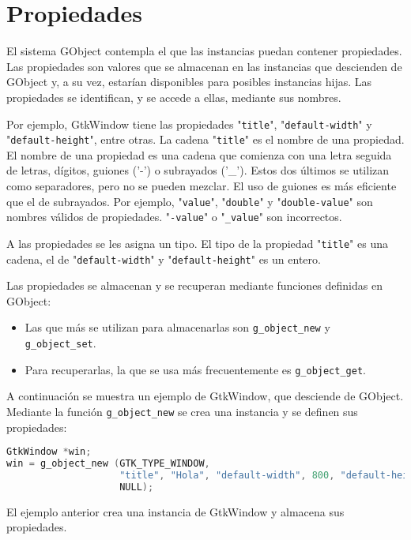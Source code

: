 %

\section{Propiedades}
El sistema \textsf{GObject} contempla el que las instancias puedan contener propiedades. Las propiedades son valores que se almacenan en las instancias que descienden de \textsf{GObject} y, a su vez, estarían disponibles para posibles instancias hijas.
Las propiedades se identifican, y se accede a ellas, mediante sus nombres.

Por ejemplo, \textsf{GtkWindow} tiene las propiedades "\texttt{title}",
"\texttt{default-width}" y "\texttt{default-height}", entre otras. La cadena
"\texttt{title}" es el nombre de una propiedad. El nombre de una propiedad es una cadena
que comienza con una letra seguida de letras, dígitos, guiones ('-') o subrayados
('\_'). Estos dos últimos se utilizan como separadores, pero no se pueden mezclar. El
uso de guiones es más eficiente que el de subrayados. Por ejemplo, "\texttt{value}",
"\texttt{double}" y "\texttt{double-value}" son nombres válidos de propiedades.
"\texttt{-value}" o "\texttt{\_value}" son incorrectos.

A las propiedades se les asigna un tipo. El tipo de la propiedad "\texttt{title}" es una cadena, el de "\texttt{default-width}" y "\texttt{default-height}" es un entero.

Las propiedades se almacenan y se recuperan mediante funciones definidas en
\textsf{GObject}:
\vspace{-\topsep}
\begin{itemize}
  \tightlist
\item Las que más se utilizan para almacenarlas son \texttt{g\_object\_new} y \texttt{g\_object\_set}.
\item Para recuperarlas, la que se usa más frecuentemente es \texttt{g\_object\_get}.
\end{itemize}

A continuación se muestra un ejemplo de \textsf{GtkWindow}, que desciende de
\textsf{GObject}. Mediante la función \texttt{g\_object\_new} se crea una instancia y se
definen sus propiedades:
\begin{lstlisting}[language=C]
GtkWindow *win;
win = g_object_new (GTK_TYPE_WINDOW,
                    "title", "Hola", "default-width", 800, "default-height", 600,
                    NULL);
\end{lstlisting}
El ejemplo anterior crea una instancia de \textsf{GtkWindow} y almacena sus propiedades.

